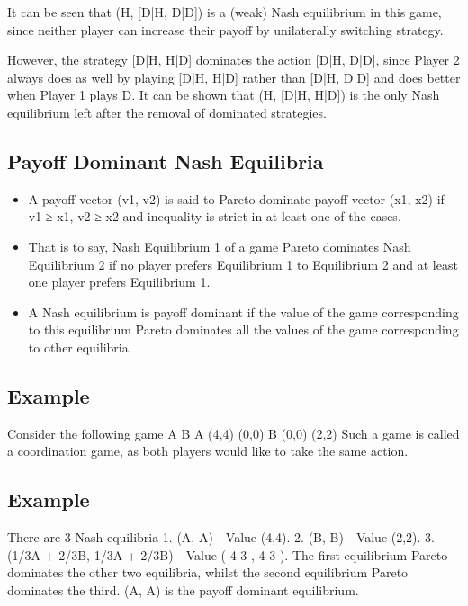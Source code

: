 \documentclass[]{report}
\begin{document}
It can be seen that (H, [D|H, D|D]) is a (weak) Nash equilibrium
in this game, since neither player can increase their payoff by
unilaterally switching strategy.

However, the strategy [D|H, H|D] dominates the action
[D|H, D|D], since Player 2 always does as well by playing
[D|H, H|D] rather than [D|H, D|D] and does better when Player 1
plays D.
It can be shown that (H, [D|H, H|D]) is the only Nash equilibrium
left after the removal of dominated strategies.
\subsection{Payoff Dominant Nash Equilibria}
\begin{itemize}
	\item A payoff vector (v1, v2) is said to Pareto dominate payoff vector
	(x1, x2) if v1 ≥ x1, v2 ≥ x2 and inequality is strict in at least one of
	the cases.
	\item	That is to say, Nash Equilibrium 1 of a game Pareto dominates
	Nash Equilibrium 2 if no player prefers Equilibrium 1 to Equilibrium
	2 and at least one player prefers Equilibrium 1.
	\item	A Nash equilibrium is payoff dominant if the value of the game
	corresponding to this equilibrium Pareto dominates all the values
	of the game corresponding to other equilibria.
\end{itemize}

\subsection{Example}
Consider the following game
A B
A (4,4) (0,0)
B (0,0) (2,2)
Such a game is called a coordination game, as both players would
like to take the same action.
\subsection{Example}
There are 3 Nash equilibria
1. (A, A) - Value (4,4).
2. (B, B) - Value (2,2).
3. (1/3A + 2/3B, 1/3A + 2/3B) - Value ( 4
3
,
4
3
).
The first equilibrium Pareto dominates the other two equilibria,
whilst the second equilibrium Pareto dominates the third.
(A, A) is the payoff dominant equilibrium.
\end{document}
